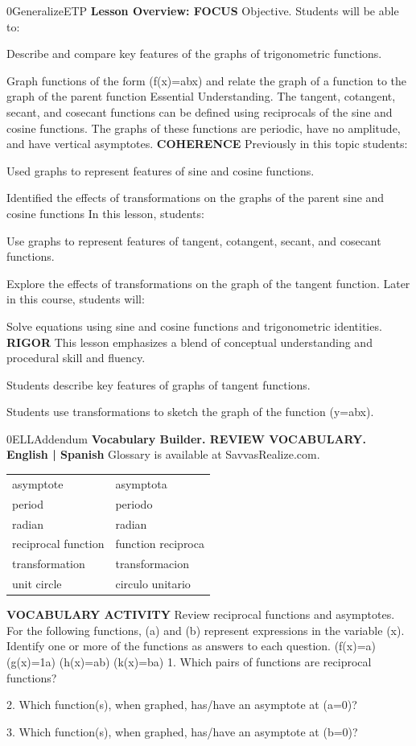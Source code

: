\documentclass{article}
\newenvironment{te-addendum}[2]{}{}     %
\newcommand{\answer}[1]{}               %
\begin{document}
\begin{te-addendum}{0}{GeneralizeETP}
\textbf{Lesson Overview: FOCUS}
Objective. Students will be able to:
\item Describe and compare key features of the graphs of trigonometric functions.
\item Graph functions of the form (f(x)=a\tan bx) and relate the graph of a function to the graph of the parent function
Essential Understanding. The tangent, cotangent, secant, and cosecant functions can be defined using reciprocals of the sine and cosine functions. The graphs of these functions are periodic, have no amplitude, and have vertical asymptotes.
\textbf{COHERENCE}
Previously in this topic students:
\item Used graphs to represent features of sine and cosine functions.
\item Identified the effects of transformations on the graphs of the parent sine and cosine functions
In this lesson, students:
\item Use graphs to represent features of tangent, cotangent, secant, and cosecant functions.
\item Explore the effects of transformations on the graph of the tangent function.
Later in this course, students will:
\item Solve equations using sine and cosine functions and trigonometric identities.
\textbf{RIGOR}
This lesson emphasizes a blend of conceptual understanding and procedural skill and fluency.
\item Students describe key features of graphs of tangent functions.
\item Students use transformations to sketch the graph of the function (y=a\tan bx).
\end{te-addendum}
\begin{te-addendum}{0}{ELLAddendum}
\textbf{Vocabulary Builder. REVIEW VOCABULARY. English | Spanish}
Glossary is available at SavvasRealize.com.
\begin{tabular}{ll}
asymptote & asymptota \\
period & periodo \\
radian & radian \\
reciprocal function & function reciproca \\
transformation & transformacion \\
unit circle & circulo unitario \\
\end{tabular}
\textbf{VOCABULARY ACTIVITY}
Review reciprocal functions and asymptotes.
For the following functions, (a) and (b) represent expressions in the variable (x). Identify one or more of the functions as answers to each question.
(f(x)=a) (g(x)=\frac1a) (h(x)=\frac ab) (k(x)=\frac ba)
1. Which pairs of functions are reciprocal functions?
\answer{1. f and g, h and k}
2. Which function(s), when graphed, has/have an asymptote at (a=0)?
\answer{2. g and k}
3. Which function(s), when graphed, has/have an asymptote at (b=0)?
\answer{3. h}
\end{te-addendum}
\end{document}
